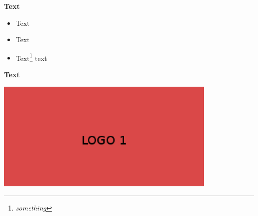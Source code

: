 \begin{frame}[t,fragile] %
  \textbf{Text}

  \vfill
  {%
    \begin{itemize}
      \item<2-> Text
      \item<3-> Text
      \item<4-> Text\footnote<5->{\textit{something}} text
    \end{itemize}

    \medskip
    \java%
  }
  \vfill
\end{frame}

\begin{frame}[t]
  \textbf{Text}

  \vfill
  {%
    \begin{center}
      \includegraphics[width=0.8\textwidth]{logo1.jpg}
    \end{center}
  }
\end{frame}
